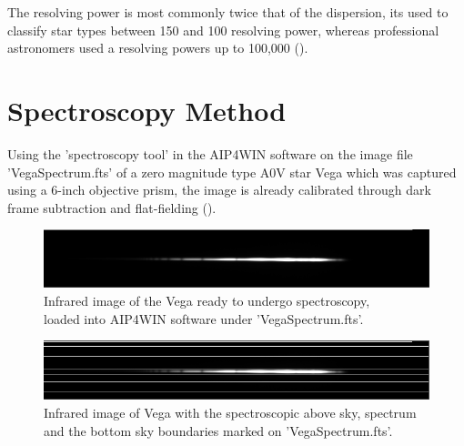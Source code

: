 \documentclass[12pt]{article}
\begin{document}
\noindent The resolving power is most commonly twice that of the dispersion, its used to classify star types between 150 and 100 resolving power, whereas professional astronomers used a resolving powers up to 100,000 (\cite{ImageProcessing}). 

\section{Spectroscopy Method}
\label{Section 3}

Using the 'spectroscopy tool' in the AIP4WIN software on the image file 'VegaSpectrum.fts' of a zero magnitude type A0V star Vega which was captured using a 6-inch objective prism, the image is already calibrated through dark frame subtraction and flat-fielding (\cite{ImageProcessingTutorial}).

\begin{figure} [H]
  \centering
  \ContinuedFloat*
  \includegraphics[scale=0.93]{Images/AsImages/S3/VegaImage.PNG}
  \caption{\label{Vega Image}Infrared image of the Vega ready to undergo spectroscopy, \\ loaded into AIP4WIN software under 'VegaSpectrum.fts'.}
\end{figure}
\vspace{-0.5cm}
\begin{figure}[H]
  \centering
  \ContinuedFloat
  \includegraphics[scale=0.93]{Images/AsImages/S3/VegaSpectrum.PNG}
  \caption{\label{Vega Spectrum}Infrared image of Vega with the spectroscopic above sky, spectrum \\ and the bottom sky boundaries marked on 'VegaSpectrum.fts'.}
\end{figure}
\end{document}
